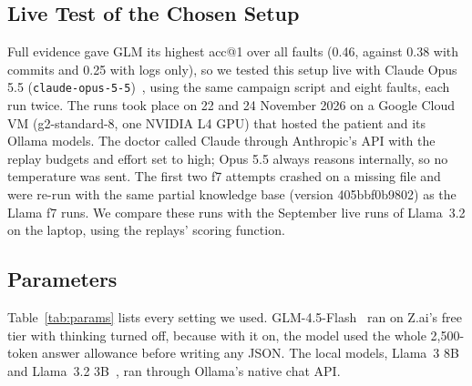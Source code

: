 \documentclass[12pt,onecolumn,draftclsnofoot]{IEEEtran}
\begin{document}
\subsection{Live Test of the Chosen Setup}
Full evidence gave GLM its highest acc@1 over all faults (0.46, against 0.38 with commits and 0.25 with logs only), so we tested this setup live with Claude Opus 5.5 (\texttt{claude-}\allowbreak\texttt{opus-5-5})~\cite{anthropic2026opus55}, using the same campaign script and eight faults, each run twice. The runs took place on 22 and 24 November 2026 on a Google Cloud VM (g2-standard-8, one NVIDIA L4 GPU) that hosted the patient and its Ollama models. The doctor called Claude through Anthropic's API with the replay budgets and effort set to high; Opus 5.5 always reasons internally, so no temperature was sent. The first two f7 attempts crashed on a missing file and were re-run with the same partial knowledge base (version 405bbf0b9802) as the Llama f7 runs. We compare these runs with the September live runs of Llama~3.2 on the laptop, using the replays' scoring function.

\subsection{Parameters}
Table~\ref{tab:params} lists every setting we used. GLM-4.5-Flash~\cite{glm2025glm45} ran on Z.ai's free tier with thinking turned off, because with it on, the model used the whole 2,500-token answer allowance before writing any JSON. The local models, Llama~3 8B and Llama~3.2 3B~\cite{grattafiori2024llama3}, ran through Ollama's native chat API.
\end{document}
